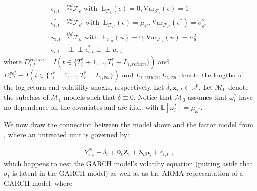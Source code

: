 \documentclass[11pt]{article}
\newcommand{\x}{\textbf{x}}
\newcommand{\simiid}{\stackrel{iid}{\sim}} %
\newcommand{\indep}{\perp \!\!\! \perp } %
\def\mrm#1{\mathrm{#1}} %
\def\mc#1{\mathcal{#1}} %
\def\E{\mathbb{E}} %
\def\mc#1{\mathcal{#1}}
\theoremstyle{definition}
\begin{document}
  \begin{align*}
    \epsilon_{i,t} &\simiid \mc{F}_{\epsilon} \text{ with }  \; \mrm{E}_{\mc{F}_{\epsilon}}(\epsilon) = 0, \mrm{Var}_{\mc{F}_{\epsilon}}(\epsilon)  = 1  \\
    \epsilon^{*}_{i,t} &\simiid \mc{F}_{\epsilon^{*}} \text{ with }  \; \mrm{E}_{\mc{F}_{\epsilon^{*}}}(\epsilon) = \mu_{\epsilon^{*}}, \mrm{Var}_{\mc{F}_{\epsilon^{*}}}(\epsilon^{*})  = \sigma^2_{\epsilon^{*}}  \\
    u_{i,t} & \simiid  \mc{F}_{u} \text{ with }  \; \mrm{E}_{\mc{F}_{u}}(u) = 0, \mrm{Var}_{\mc{F}_{u}}(u) = \sigma^2_{u}\\
    \epsilon_{i,t} & \indep  \epsilon^{*}_{i,t}  \indep u_{i,t}
    \end{align*}
where $D^{return}_{i,t} = I(t \in \{T_i^* + 1,...,T_i^* + L_{i, return}\})$ and $D^{vol}_{i,t} = I(t \in \{T_i^* + 1,...,T_i^* + L_{i, vol}\})$ and $L_{i,return},L_{i,vol}$ denote the lengths of the log return and volatility shocks, respectively. Let $\delta, \x_{i,t} \in \mathbb{R}^{p}$.  Let $\mc{M}_{0}$ denote the subclass of $\mc{M}_{1}$ models such that $\delta \equiv 0$.  Notice that $\mc{M}_{0}$ assumes that $\omega^{*}_i$ have no dependence on the covariates and are i.i.d. with $\E[ \omega^{*}_i]=\mu_{\omega^{*}}$. 

We now draw the connection between the model above and the factor model from \citet{abadie2010synthetic}, where an untreated unit is governed by:

\begin{align}
Y^{N}_{i,t} = \delta_{t} + \boldsymbol\theta_{t}\textbf{Z}_{i}+\boldsymbol\lambda_{t}\boldsymbol\mu_{i}+\varepsilon_{i,t} \text{ ,} \label{abadie_factor_model}
\end{align}
which happens to nest the GARCH model's volatilty equation (putting aside that $\sigma_{t}$ is latent in the GARCH model) as well as as the ARMA representation of a GARCH model, where
\end{document}
